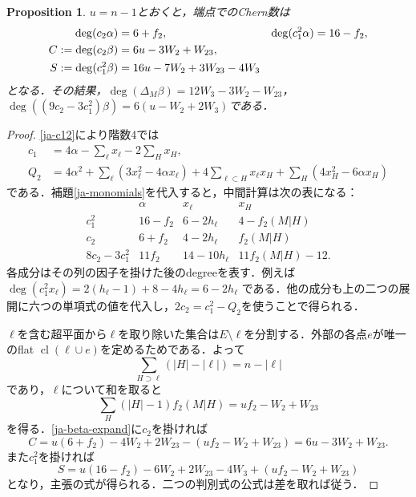 \documentclass[12pt]{amsart}
\newtheorem{prop}[thm]{Proposition}
\theoremstyle{definition}
\theoremstyle{remark}
\numberwithin{equation}{section}
\begin{document}
\begin{prop}\label{ja-moments}
$u=n-1$とおくと，端点でのChern数は
\begin{align}\label{ja-endpoints}
 \deg(c_2\alpha)&=6+f_2,& \deg(c_1^2\alpha)&=16-f_2,\notag\\
 C:=\deg(c_2\beta)&=6u-3W_2+W_{23},\\
 S:=\deg(c_1^2\beta)&=16u-7W_2+3W_{23}-4W_3\notag
\end{align}
となる．その結果，$\deg(\Delta_M\beta)=12W_3-3W_2-W_{23}$，
$\deg((9c_2-3c_1^2)\beta)=6(u-W_2+2W_3)$である．
\end{prop}
\begin{proof}
\eqref{ja-c12}により階数4では
\begin{align*}
 c_1&=4\alpha-\sum_\ell x_\ell-2\sum_Hx_H,\\
 Q_2&=4\alpha^2+\sum_\ell(3x_\ell^2-4\alpha x_\ell)
       +4\sum_{\ell\subset H}x_\ell x_H
       +\sum_H(4x_H^2-6\alpha x_H)
\end{align*}
である．補題\ref{ja-monomials}を代入すると，中間計算は次の表になる：
\[
\begin{array}{c|ccc}
 &\alpha&x_\ell&x_H\\\hline
 c_1^2&16-f_2&6-2h_\ell&4-f_2(M|H)\\
 c_2&6+f_2&4-2h_\ell&f_2(M|H)\\
 8c_2-3c_1^2&11f_2&14-10h_\ell&11f_2(M|H)-12.
\end{array}
\]
各成分はその列の因子を掛けた後のdegreeを表す．例えば
$\deg(c_1^2x_\ell)=2(h_\ell-1)+8-4h_\ell=6-2h_\ell$
である．他の成分も上の二つの展開に六つの単項式の値を代入し，$2c_2=c_1^2-Q_2$を使うことで得られる．

$\ell$を含む超平面から$\ell$を取り除いた集合は$E\setminus\ell$を分割する．外部の各点$e$が唯一のflat $\operatorname{cl}(\ell\cup e)$を定めるためである．よって
\begin{equation}\label{ja-partition}
 \sum_{H\supset\ell}(|H|-|\ell|)=n-|\ell|
\end{equation}
であり，$\ell$について和を取ると
\[
 \sum_H(|H|-1)f_2(M|H)=uf_2-W_2+W_{23}
\]
を得る．\eqref{ja-beta-expand}に$c_2$を掛ければ
\[
 C=u(6+f_2)-4W_2+2W_{23}-(uf_2-W_2+W_{23})
   =6u-3W_2+W_{23}.
\]
また$c_1^2$を掛ければ
\[
 S=u(16-f_2)-6W_2+2W_{23}-4W_3+(uf_2-W_2+W_{23})
\]
となり，主張の式が得られる．二つの判別式の公式は差を取れば従う．
\end{proof}
\end{document}

